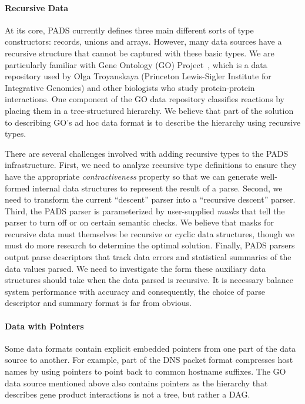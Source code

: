 \documentclass[11pt]{article}
\begin{document}
\paragraph*{Recursive Data}
At its core, PADS currently defines three main different sorts of type 
constructors: 
records, unions and arrays.  However, many data sources have a recursive
structure that cannot be captured with these basic types.  We are
particularly familiar with Gene Ontology (GO) Project~\cite{geneontology},
which is a data repository used by Olga Troyanskaya
(Princeton Lewis-Sigler Institute for Integrative Genomics) 
and other biologists who study protein-protein
interactions.  One component of the GO data repository classifies reactions by placing them
in a tree-structured hierarchy.   We believe that part of the solution
to describing GO's ad hoc data format is to describe the hierarchy
using recursive types.

There are several challenges involved with adding recursive types to the 
PADS infrastructure.  First, we need to analyze recursive type definitions
to ensure they
have the appropriate {\em contractiveness} property so that we can
generate well-formed internal data structures to represent the result of
a parse.  Second,
we need to transform the current ``descent'' parser into
a ``recursive descent'' parser.  Third, the PADS parser is 
parameterized by user-supplied {\em masks} that tell the parser
to turn off or on certain semantic checks.  We believe that
masks for recursive data must themselves be recursive or cyclic
data structures, though we must do more research to determine the
optimal solution.  Finally, PADS parsers output parse descriptors
that track data errors and statistical summaries of the data values
parsed.  We need to investigate the form these auxiliary
data structures should take when the data parsed is recursive. 
It is necessary balance system performance with accuracy
and consequently, the choice of parse descriptor and summary 
format is far from obvious.

\paragraph*{Data with Pointers}
Some data formats contain explicit embedded pointers 
from one part of the data source to another.
For example, part of the DNS packet format compresses
host names by using pointers to point back to common
hostname suffixes.  The GO data source
mentioned above also contains pointers as the
hierarchy that describes gene product interactions
is not a tree, but rather a DAG.  
\end{document}
